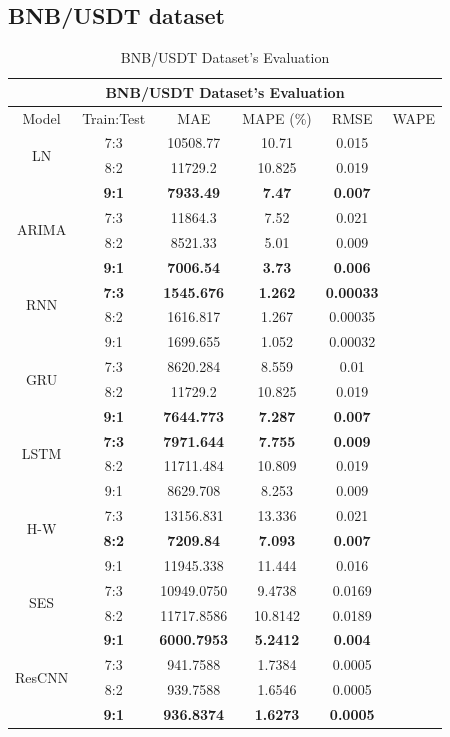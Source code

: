 \documentclass{ieeeojies}
\begin{document}
\subsection{BNB/USDT dataset} 
\begin{table}[H]
    \centering
    \begin{tabular}{|c|c|c|c|c|c|}
         \hline
         \multicolumn{6}{|c|}{\textbf{BNB/USDT Dataset's Evaluation}}\\
         \hline
         \centering Model & Train:Test & MAE & MAPE (\%) & RMSE & WAPE\\
         \hline
         \multirow{2}{*}{LN} & 7:3 & 10508.77 & 10.71 & 0.015 \\ & 8:2 & 11729.2 & 10.825 & 0.019 \\ & \textbf{9:1} & \textbf{7933.49} & \textbf{7.47} & \textbf{0.007}\\
         \hline
         \multirow{2}{*}{ARIMA} & 7:3&11864.3&7.52&0.021\\ & 8:2&8521.33&5.01&0.009 \\ & \textbf{9:1} & \textbf{7006.54} & \textbf{3.73} & \textbf{0.006}\\
         \hline
         \multirow{2}{*}{RNN} & \textbf{7:3}	& \textbf{1545.676} & \textbf{1.262} & \textbf{0.00033} \\ & 8:2 & 1616.817 & 1.267 & 0.00035 \\ & 9:1 & 1699.655  & 1.052 & 0.00032\\
         \hline
         \multirow{2}{*}{GRU} & 7:3 &  8620.284 &  8.559 & 0.01 \\ & 8:2 &  11729.2 & 10.825 & 0.019 \\ & \textbf{9:1} & \textbf{7644.773}  & \textbf{7.287} & \textbf{0.007}\\
         \hline
         \multirow{2}{*}{LSTM} & \textbf{7:3}	& \textbf{7971.644} & \textbf{7.755} & \textbf{0.009} \\ & 8:2 & 11711.484 & 10.809 & 0.019 \\ & 9:1 & 8629.708 & 8.253 & 0.009\\
         \hline
         \multirow{2}{*}{H-W} & 7:3 & 13156.831&13.336 & 0.021 \\ & \textbf{8:2} &	\textbf{7209.84} & \textbf{7.093} & \textbf{0.007} \\ & 9:1 &11945.338	&11.444&0.016\\
         \hline
         \multirow{2}{*}{SES} & 7:3 & 10949.0750 & 9.4738 & 0.0169 \\ & 8:2 & 11717.8586 &10.8142 & 0.0189 \\ & \textbf{9:1} &  	\textbf{6000.7953} &	\textbf{5.2412} & 	\textbf{0.004} \\
         \hline
         \multirow{2}{*}{ResCNN} & 7:3 & 941.7588 &  1.7384 &  0.0005 \\ & 8:2 & 939.7588 &  1.6546 &  0.0005 \\ & \textbf{9:1} & \textbf{936.8374} & \textbf{1.6273} & \textbf{0.0005}\\
         \hline
    \end{tabular}
    \caption{BNB/USDT Dataset's Evaluation}
    \label{bnbresult}
\end{table}
\end{document}
